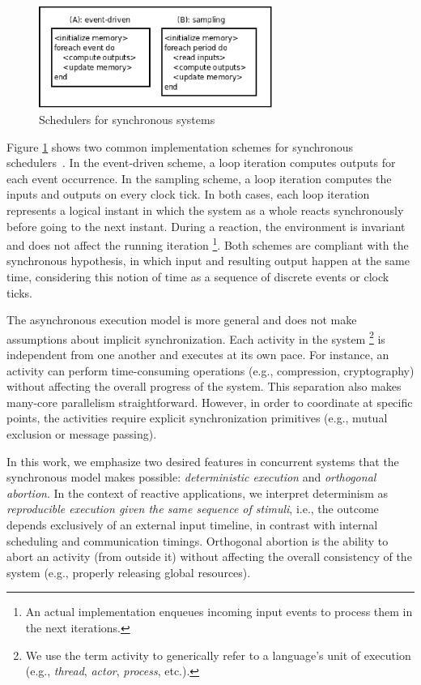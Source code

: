 \documentclass{acm_proc_article-sp}
\newcommand{\CEU}{\textsc{C\'{e}u}\xspace}
\newcommand{\1}{\;}
\newcommand{\2}{\;\;}
\newcommand{\3}{\;\;\;}
\newcommand{\5}{\;\;\;\;\;}
\begin{document}
\begin{figure}
\centering
\includegraphics[width=3.0in]{sync_impl.eps}
\caption{Schedulers for synchronous systems}
\label{fig.impl}
\end{figure}

Figure \ref{fig.impl} shows two common implementation schemes for synchronous 
schedulers~\cite{rp.twelve}.
%
In the event-driven scheme, a loop iteration computes outputs for each event 
occurrence.
%
In the sampling scheme, a loop iteration computes the inputs and outputs on 
every clock tick.
%
In both cases, each loop iteration represents a logical instant in which the 
system as a whole reacts synchronously before going to the next instant.
%
During a reaction, the environment is invariant and does not affect the running 
iteration%
\footnote{
An actual implementation enqueues incoming input events to process them in the 
next iterations.
}.
%
Both schemes are compliant with the synchronous hypothesis, in which input and 
resulting output happen at the same time, considering this notion of time as a 
sequence of discrete events or clock ticks.

The asynchronous execution model is more general and does not make assumptions 
about implicit synchronization.
Each activity in the system%
\footnote{We use the term activity to generically refer to a language's unit of 
execution (e.g., \emph{thread}, \emph{actor}, \emph{process}, etc.).}
is independent from one another and executes at its own pace.
%
For instance, an activity can perform time-consuming operations (e.g., 
compression, cryptography) without affecting the overall progress of the 
system.
%
This separation also makes many-core parallelism straightforward.
%
However, in order to coordinate at specific points, the activities require 
explicit synchronization primitives (e.g., mutual exclusion or message 
passing).


In this work, we emphasize two desired features in concurrent systems that the 
synchronous model makes possible: \emph{deterministic execution} and 
\emph{orthogonal abortion}.
%
In the context of reactive applications, we interpret determinism as 
\emph{reproducible execution given the same sequence of stimuli}, i.e., the 
outcome depends exclusively of an external input timeline, in contrast with 
internal scheduling and communication timings.
%
Orthogonal abortion is the ability to abort an activity (from outside it) 
without affecting the overall consistency of the system (e.g., properly 
releasing global resources).
\end{document}
